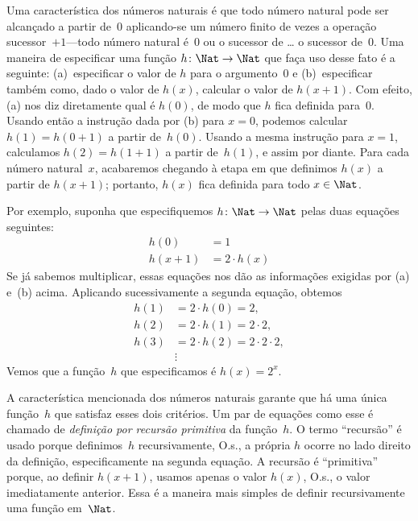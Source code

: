 \documentclass[../../../include/open-logic-section]{subfiles}
\begin{document}

Uma característica dos números naturais é que todo número natural pode ser
alcançado a partir de~$0$ aplicando-se um número finito de vezes a operação
sucessor~$+1$---todo número natural é~$0$ ou o sucessor de \dots{} o
sucessor de~$0$. Uma maneira de especificar uma função
$h\colon\Nat \to \Nat$ que faça uso desse fato é a seguinte: (a)~especificar
o valor de $h$ para o argumento~$0$ e (b)~especificar também como, dado o
valor de $h(x)$, calcular o valor de $h(x+1)$. Com efeito, (a) nos diz diretamente
qual é $h(0)$, de modo que $h$ fica definida para~$0$. Usando então a
instrução dada por (b) para $x=0$, podemos calcular $h(1) = h(0+1)$ a partir
de~$h(0)$. Usando a mesma instrução para $x=1$, calculamos
$h(2) = h(1+1)$ a partir de~$h(1)$, e assim por diante. Para cada número
natural~$x$, acabaremos chegando à etapa em que definimos $h(x)$ a partir de
$h(x+1)$; portanto, $h(x)$ fica definida para todo $x \in \Nat$.

Por exemplo, suponha que especifiquemos $h\colon \Nat \to \Nat$ pelas duas
equações seguintes:
\begin{align*}
h(0) & =  1\\
h(x+1) & =  2 \cdot h(x)
\end{align*}
Se já sabemos multiplicar, essas equações nos dão as informações exigidas
por (a) e~(b) acima. Aplicando sucessivamente a segunda equação, obtemos
\begin{align*}
  h(1) & = 2\cdot h(0) = 2,\\
  h(2) & = 2\cdot h(1) = 2\cdot 2,\\
  h(3) & = 2 \cdot h(2) = 2\cdot 2 \cdot 2,\\
  & \vdots
\end{align*}
Vemos que a função~$h$ que especificamos é $h(x) = 2^x$.

A característica mencionada dos números naturais garante que há uma única
função~$h$ que satisfaz esses dois critérios. Um par de equações como esse é
chamado de \emph{definição por recursão primitiva} da função~$h$. O termo
``recursão'' é usado porque definimos~$h$ recursivamente, O.s.\@, a própria
$h$ ocorre no lado direito da definição, especificamente na segunda equação.
A recursão é ``primitiva'' porque, ao definir $h(x+1)$, usamos apenas o valor
$h(x)$, O.s.\@, o valor imediatamente anterior. Essa é a maneira mais simples
de definir recursivamente uma função em~$\Nat$.
\end{document}
